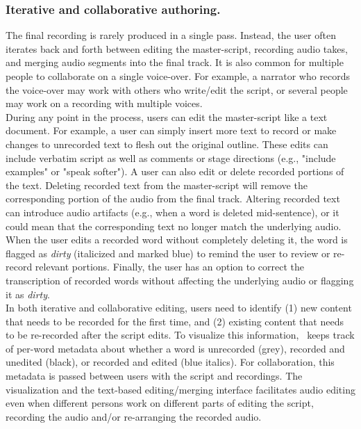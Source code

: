 \subsubsection{Iterative and collaborative authoring.} 
The final recording is rarely produced in a single pass. Instead, the user often iterates back
and forth between editing the master-script, recording audio takes, and merging
audio segments into the final track. It is also common for multiple people to collaborate on a single voice-over. For example, a narrator who records the voice-over may work with others who write/edit the script, or several people may work on a recording with multiple voices. \\ 

During any point in the process, users can edit the master-script
like a text document.  For example, a user can simply insert
more text to record or make changes to unrecorded text to flesh
out the original outline. These edits can include verbatim script as well as comments or stage directions (e.g., "include examples" or "speak softer").
A user can also edit or delete recorded portions of the text. Deleting recorded text from the master-script will remove the corresponding portion of the audio from the final track. Altering recorded text can introduce audio artifacts (e.g., when a word is deleted mid-sentence), or it could mean that the corresponding text no longer match the underlying audio. When the user edits a recorded word without completely deleting it, the word is flagged as \textit{dirty} (italicized and marked blue) to remind the user to review or re-record relevant portions. Finally, the user has an option to correct the transcription of recorded words without affecting the underlying audio or flagging it as \textit{dirty}.\\

In both iterative and collaborative editing, users need to identify (1) new content that needs to be recorded for the first time, and (2) existing content that needs to be re-recorded after the script edits. To visualize this information,  \voicescript\ keeps track of per-word metadata about whether a word is unrecorded (grey), recorded and unedited (black), or recorded and edited (blue italics). For collaboration, this metadata is passed between users with the script and recordings. The visualization and the text-based  editing/merging interface facilitates audio editing even when different persons work on different parts of editing the script, recording the audio and/or re-arranging the recorded audio. \\ 

